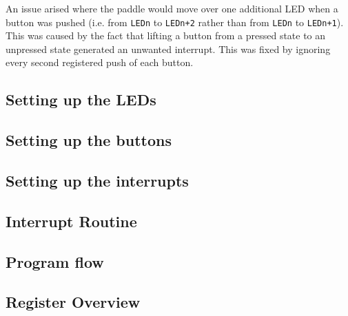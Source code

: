 An issue arised where the paddle would move over one additional LED when a button was pushed (i.e. from \texttt{LEDn} to \texttt{LEDn+2} rather than from \texttt{LEDn} to \texttt{LEDn+1}).
This was caused by the fact that lifting a button from a pressed state to an unpressed state generated an unwanted interrupt.
This was fixed by ignoring every second registered push of each button.

    \subsection{Setting up the LEDs}
        
        

    \subsection{Setting up the buttons}

        

    \subsection{Setting up the interrupts}

        

    \subsection{Interrupt Routine}

        

    \newpage

    \subsection{Program flow}

        

        \newpage

    \subsection{Register Overview}

        

